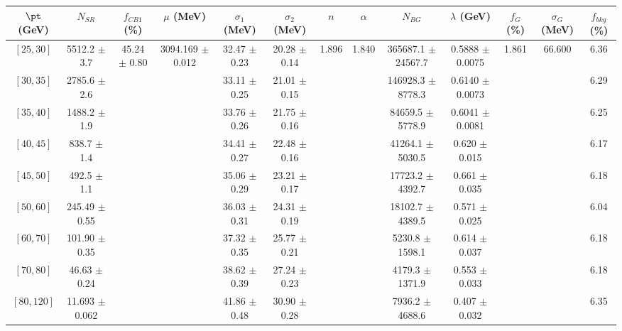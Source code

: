 \begin{tabular}{c||c|c|c|c|c|c|c|c|c|c|c||c}
$\pt$ (GeV) & $N_{SR}$ & $f_{CB1}$ (\%) & $\mu$ (MeV) & $\sigma_1$ (MeV) & $\sigma_2$ (MeV) & $n$ & $\alpha$ & $N_{BG}$ & $\lambda$ (GeV) & $f_G$ (\%) & $\sigma_G$ (MeV) & $f_{bkg}$ (\%) \\
\hline
$[25, 30]$ & 5512.2 $\pm$ 3.7 & \multirow{9}{*}{45.24 $\pm$ 0.80} & \multirow{9}{*}{3094.169 $\pm$ 0.012} & 32.47 $\pm$ 0.23 & 20.28 $\pm$ 0.14 & \multirow{9}{*}{1.896} & \multirow{9}{*}{1.840} & 365687.1 $\pm$ 24567.7 & 0.5888 $\pm$ 0.0075 & \multirow{9}{*}{1.861} & \multirow{9}{*}{66.600} & 6.36\\
$[30, 35]$ & 2785.6 $\pm$ 2.6 &  &  & 33.11 $\pm$ 0.25 & 21.01 $\pm$ 0.15 &  &  & 146928.3 $\pm$ 8778.3 & 0.6140 $\pm$ 0.0073 &  &  & 6.29\\
$[35, 40]$ & 1488.2 $\pm$ 1.9 &  &  & 33.76 $\pm$ 0.26 & 21.75 $\pm$ 0.16 &  &  & 84659.5 $\pm$ 5778.9 & 0.6041 $\pm$ 0.0081 &  &  & 6.25\\
$[40, 45]$ & 838.7 $\pm$ 1.4 &  &  & 34.41 $\pm$ 0.27 & 22.48 $\pm$ 0.16 &  &  & 41264.1 $\pm$ 5030.5 & 0.620 $\pm$ 0.015 &  &  & 6.17\\
$[45, 50]$ & 492.5 $\pm$ 1.1 &  &  & 35.06 $\pm$ 0.29 & 23.21 $\pm$ 0.17 &  &  & 17723.2 $\pm$ 4392.7 & 0.661 $\pm$ 0.035 &  &  & 6.18\\
$[50, 60]$ & 245.49 $\pm$ 0.55 &  &  & 36.03 $\pm$ 0.31 & 24.31 $\pm$ 0.19 &  &  & 18102.7 $\pm$ 4389.5 & 0.571 $\pm$ 0.025 &  &  & 6.04\\
$[60, 70]$ & 101.90 $\pm$ 0.35 &  &  & 37.32 $\pm$ 0.35 & 25.77 $\pm$ 0.21 &  &  & 5230.8 $\pm$ 1598.1 & 0.614 $\pm$ 0.037 &  &  & 6.18\\
$[70, 80]$ & 46.63 $\pm$ 0.24 &  &  & 38.62 $\pm$ 0.39 & 27.24 $\pm$ 0.23 &  &  & 4179.3 $\pm$ 1371.9 & 0.553 $\pm$ 0.033 &  &  & 6.18\\
$[80, 120]$ & 11.693 $\pm$ 0.062 &  &  & 41.86 $\pm$ 0.48 & 30.90 $\pm$ 0.28 &  &  & 7936.2 $\pm$ 4688.6 & 0.407 $\pm$ 0.032 &  &  & 6.35\\
\end{tabular}
